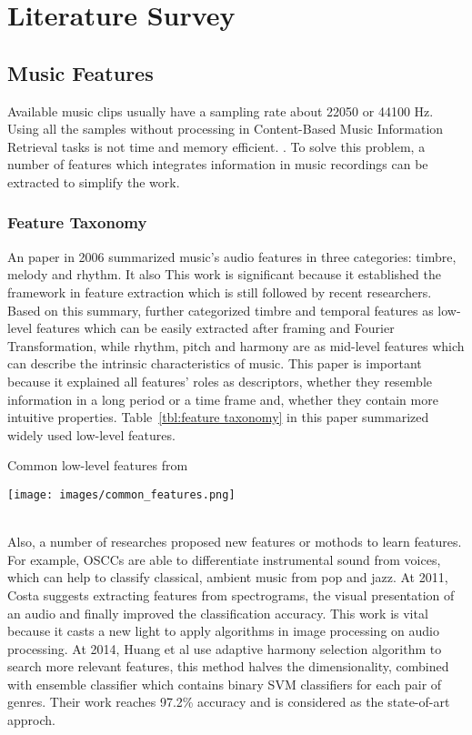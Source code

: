 \documentclass[a4paper, 11pt]{report}
\begin{document}
\chapter{Literature Survey}
\section{Music Features} 
Available music clips usually have a sampling rate about 22050 or 44100 Hz. Using all the samples without processing in Content-Based Music Information Retrieval tasks is not time and memory efficient. \cite{review}. To solve this problem, a number of features which integrates information in music recordings can be extracted to simplify the work. 
\subsection{Feature Taxonomy}
An paper in 2006 summarized music's audio features in three categories: timbre, melody and rhythm. It also  \cite{featuresummary} This work is significant because it established the framework in feature extraction which is still followed by recent researchers. \\
 Based on this summary,  \cite{fu2010survey} further categorized timbre and temporal features as low-level features which can be easily extracted after framing and Fourier Transformation, while rhythm, pitch and harmony are as mid-level features which can describe the intrinsic characteristics of music. This paper is important because it explained all features' roles as descriptors, whether they resemble information in a long period or a time frame and, whether they contain more intuitive properties. Table~\ref{tbl:feature taxonomy} in this paper summarized widely used low-level features.\\
\begin{table}[h]
	\caption{Common low-level features  from \protect{}}
	\centering
	\texttt{[image: images/common\_features.png]}
	\label{tbl:feature taxonomy}
\end{table}\\
Also, a number of researches proposed new features or mothods to learn features. For example, OSCCs are able to differentiate instrumental sound from voices\cite{maddage2004singer}, which can help to classify classical, ambient music from pop and jazz.  At 2011, Costa suggests extracting features from spectrograms, the visual presentation of an audio and finally improved the classification accuracy\cite{histogram}. This work is vital because it casts a new light to apply algorithms in image processing on audio processing. At 2014, Huang et al use adaptive harmony selection algorithm to search more relevant features, this method halves the dimensionality, combined with ensemble classifier which contains binary SVM classifiers for each pair of genres\cite{huang2014music}. Their work reaches 97.2\% accuracy and is considered as the state-of-art approch.
\end{document}
